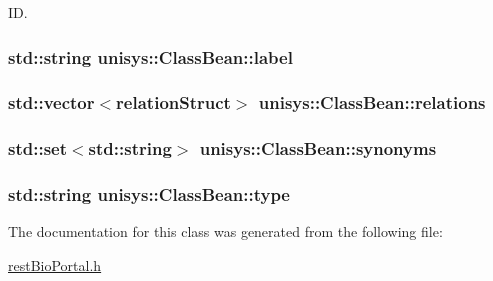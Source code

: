 I\-D. 

\hypertarget{classunisys_1_1ClassBean_ad68cdc52aa9e61e682f54cf5574d1b37}{
\subsubsection[{label}]{\setlength{\rightskip}{0pt plus 5cm}std\-::string unisys\-::\-Class\-Bean\-::label\hspace{0.3cm}{\ttfamily [private]}}}\label{classunisys_1_1ClassBean_ad68cdc52aa9e61e682f54cf5574d1b37}
\hypertarget{classunisys_1_1ClassBean_a39022db9b3e14d792b3d73c7c85c253d}{
\subsubsection[{relations}]{\setlength{\rightskip}{0pt plus 5cm}std\-::vector$<${\bf relation\-Struct}$>$ unisys\-::\-Class\-Bean\-::relations\hspace{0.3cm}{\ttfamily [private]}}}\label{classunisys_1_1ClassBean_a39022db9b3e14d792b3d73c7c85c253d}
\hypertarget{classunisys_1_1ClassBean_a50623767ece8ef538c949558bfbc53af}{
\subsubsection[{synonyms}]{\setlength{\rightskip}{0pt plus 5cm}std\-::set$<$std\-::string$>$ unisys\-::\-Class\-Bean\-::synonyms\hspace{0.3cm}{\ttfamily [private]}}}\label{classunisys_1_1ClassBean_a50623767ece8ef538c949558bfbc53af}
\hypertarget{classunisys_1_1ClassBean_a3cd934e3687f96b0dc87a3fcafbec4ca}{
\subsubsection[{type}]{\setlength{\rightskip}{0pt plus 5cm}std\-::string unisys\-::\-Class\-Bean\-::type\hspace{0.3cm}{\ttfamily [private]}}}\label{classunisys_1_1ClassBean_a3cd934e3687f96b0dc87a3fcafbec4ca}


The documentation for this class was generated from the following file\-:\begin{DoxyCompactItemize}
\item 
\hyperlink{restBioPortal_8h}{rest\-Bio\-Portal.\-h}\end{DoxyCompactItemize}

